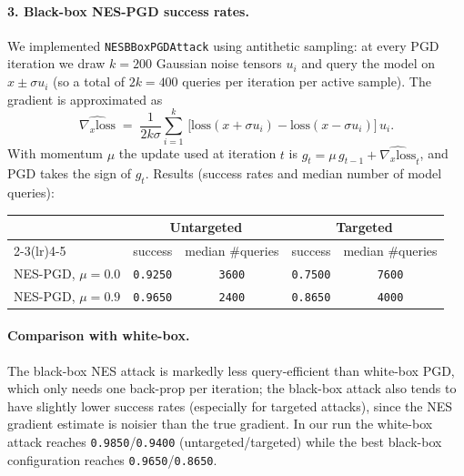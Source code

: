 \documentclass[11pt]{article}
\begin{document}
\paragraph{3. Black-box NES-PGD success rates.}
We implemented \texttt{NESBBoxPGDAttack} using antithetic sampling: at every
PGD iteration we draw \(k=200\) Gaussian noise tensors \(u_i\) and query the
model on \(x\pm\sigma u_i\) (so a total of \(2k=400\) queries per iteration
per active sample). The gradient is approximated as
\[
\widehat{\nabla_x \mathrm{loss}} \;=\;
   \frac{1}{2k\sigma}\sum_{i=1}^{k}\,\bigl[\mathrm{loss}(x+\sigma u_i)-\mathrm{loss}(x-\sigma u_i)\bigr]\, u_i .
\]
With momentum \(\mu\) the update used at iteration \(t\) is
\(g_t = \mu\, g_{t-1} + \widehat{\nabla_x\mathrm{loss}}_t\), and PGD takes the
sign of \(g_t\). Results (success rates and median number of model queries):
\begin{center}
\begin{tabular}{lcccc}
\toprule
& \multicolumn{2}{c}{Untargeted} & \multicolumn{2}{c}{Targeted}\\
\cmidrule(lr){2-3}\cmidrule(lr){4-5}
& success & median \#queries & success & median \#queries \\
\midrule
NES-PGD, \(\mu=0.0\) & \texttt{0.9250} & \texttt{3600} & \texttt{0.7500} & \texttt{7600} \\
NES-PGD, \(\mu=0.9\) & \texttt{0.9650} & \texttt{2400} & \texttt{0.8650} & \texttt{4000} \\
\bottomrule
\end{tabular}
\end{center}

\paragraph{Comparison with white-box.}
The black-box NES attack is markedly less query-efficient than white-box PGD,
which only needs one back-prop per iteration; the black-box attack also tends
to have slightly lower success rates (especially for targeted attacks), since
the NES gradient estimate is noisier than the true gradient. In our run the
white-box attack reaches \texttt{0.9850}/\texttt{0.9400}
(untargeted/targeted) while the best black-box configuration reaches
\texttt{0.9650}/\texttt{0.8650}.
\end{document}
